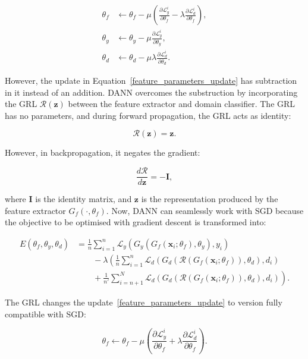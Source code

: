 \begin{align}
	\theta_f &\gets \theta_f - \mu \left(
	\frac{\partial \mathcal{L}_y^i}{\partial \theta_f}
	- \lambda \frac{\partial \mathcal{L}_d^i}{\partial \theta_f}
	\right),
	\label{feature_parameters_update} \\
	\theta_y &\gets \theta_y - \mu
	\frac{\partial \mathcal{L}_y^i}{\partial \theta_y}, \\
	\theta_d &\gets \theta_d - \mu \lambda
	\frac{\partial \mathcal{L}_d^i}{\partial \theta_d}.
\end{align}

However, the update in Equation~\ref{feature_parameters_update} has subtraction in it instead of an addition.
DANN overcomes the substruction by incorporating the GRL \(\mathcal{R}(\mathbf{z})\) between the feature extractor and domain classifier.
The GRL has no parameters, and during forward propagation, the GRL acts as identity:

\begin{equation}
	\mathcal{R}(\mathbf{z}) = \mathbf{z}.
\end{equation}

However, in backpropagation, it negates the gradient:

\begin{equation}
	\frac{d \mathcal{R}}{d \mathbf{z}} = -\mathbf{I},
\end{equation}

where \(\mathbf{I}\) is the identity matrix,
and \(\mathbf{z}\) is the representation produced by the feature extractor
\(G_f(\cdot, \theta_f)\).
Now, DANN can seamlessly work with SGD
because the objective to be optimised with gradient descent is transformed into:

\begin{align}
	E(\theta_f, \theta_y, \theta_d) &= \frac{1}{n} \sum^{n}_{i = 1} \mathcal{L}_y(G_y(G_f(\mathbf{x}_i; \theta_f), \theta_y), y_i) \nonumber \\
	&\qquad {} - \lambda \left(\frac{1}{n} \sum^{n}_{i = 1} \mathcal{L}_d(G_d(\mathcal{R}(G_f(\mathbf{x}_i; \theta_f)), \theta_d), d_i) \right. \nonumber \\
	&\qquad \left. {} + \frac{1}{n'} \sum^{N}_{i = n + 1} \mathcal{L}_d(G_d(\mathcal{R}(G_f(\mathbf{x}_i; \theta_f)), \theta_d), d_i)\right).
	\label{dann_loss}
\end{align}

The GRL changes the update~\ref{feature_parameters_update}
to version fully compatible with SGD:

\begin{equation}
	\theta_f \gets \theta_f - \mu \left(
	\frac{\partial \mathcal{L}_y^i}{\partial \theta_f}
	+ \lambda \frac{\partial \mathcal{L}_d^i}{\partial \theta_f}
	\right).
\end{equation}

